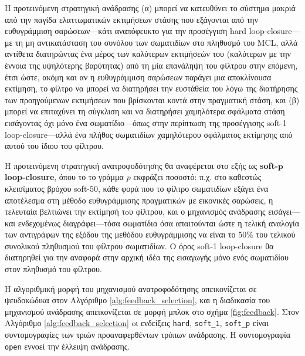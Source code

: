 Η προτεινόμενη στρατηγική ανάδρασης (α) μπορεί να κατευθύνει το σύστημα μακριά
από την παγίδα ελαττωματικών εκτιμήσεων στάσης που εξάγονται από την
ευθυγράμμιση σαρώσεων---κάτι αναπόφευκτο για την προσέγγιση hard
loop-closure---με τη μη αντικατάσταση του συνόλου των σωματιδίων στο πληθυσμό
του MCL, αλλά αντίθετα διατηρώντας ένα μέρος των καλύτερων εκτιμήσεών του
(καλύτερων με την έννοια της υψηλότερης βαρύτητας) από τη μία επανάληψη του
φίλτρου στην επόμενη, έτσι ώστε, ακόμη και αν η ευθυγράμμιση σαρώσεων παράγει
μια αποκλίνουσα εκτίμηση, το φίλτρο να μπορεί να διατηρήσει την ευστάθεία του
λόγω της διατήρησης των προηγούμενων εκτιμήσεων που βρίσκονται κοντά στην
πραγματική στάση, και (β) μπορεί να επιταχύνει τη σύγκλιση και να διατηρήσει
χαμηλότερα σφάλματα στάση εισάγοντας όχι μόνο ένα σωματίδιο---όπως στην
περίπτωση της προσέγγισης soft-1 loop-closure---αλλά ένα πλήθος σωματιδίων
χαμηλότερου σφάλματος εκτίμησης από αυτού του ίδιου του φίλτρου.

Η προτεινόμενη στρατηγική ανατροφοδότησης θα αναφέρεται στο εξής ως
\textbf{soft-}$\bm{p}$ \textbf{loop-closure}, όπου το το γράμμα $p$ εκφράζει
ποσοστό: π.χ. στο καθεστώς κλεισίματος βρόχου soft-$50$, κάθε φορά που το
φίλτρο σωματιδίων εξάγει ένα αποτέλεσμα στη μέθοδο ευθυγράμμισης πραγματικών με
εικονικές σαρώσεις, η τελευταία βελτιώνει την εκτίμησή τoυ φίλτρου, και ο
μηχανισμός ανάδρασης εισάγει---και ενδεχομένως διαγράφει---τόσα σωματίδια όσα
απαιτούνται ώστε η τελική αναλογία των αντιγράφων της εξόδου της μεθόδου
ευθυγράμμισης να είναι το $50\%$ του τελικού συνολικού πληθυσμού του φίλτρου
σωματιδίων. Ο όρος soft-1 loop-closure θα διατηρηθεί για την αναφορά στην
αρχική ιδέα της εισαγωγής μόνο ενός σωματιδίου στον πληθυσμό του φίλτρου.

Η αλγοριθμική μορφή του μηχανισμού ανατροφοδότησης απεικονίζεται σε ψευδοκώδικα
στον Αλγόριθμο \ref{alg:feedback_selection}, και η διαδικασία του μηχανισμού
ανάδρασης απεικονίζεται σε μορφή μπλοκ στο σχήμα \ref{fig:feedback}.  Στον
Αλγόριθμο \ref{alg:feedback_selection} oι ενδείξεις \texttt{hard},
\texttt{soft\_1}, \texttt{soft\_p} είναι συντομογραφίες των τριών
προαναφερθέντων τρόπων ανάδρασης. Η συντομογραφία \texttt{open} εννοεί την
έλλειψη ανάδρασης.


